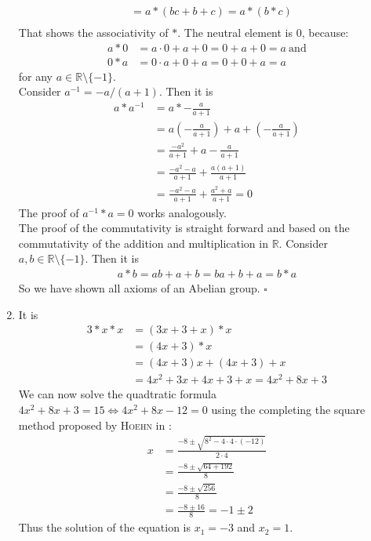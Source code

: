 \documentclass[solution]{tudexercise}
\newcommand{\qed}{\hspace*{\fill}$\square$}
\begin{document}
\begin{enumerate}
\begin{align*}
&= a * (bc + b + c) = a * (b * c)\\
				\end{align*}
				That shows the associativity of $*$.
				\newpage
				The neutral element is $0$, because: 
				\begin{align*}
a * 0 &= a \cdot 0 + a + 0 = 0 + a + 0 = a\ \text{and}\\
0 * a &= 0 \cdot a + 0 + a = 0 + 0 + a = a
				\end{align*}
				for any $a \in \mathbb{R} \setminus \{-1\}$.\\
				Consider $a^{-1} = -a / (a + 1)$. Then it is
				\begin{align*}
a * a^{-1} &= a * - \frac{a}{a + 1}\\
&= a(- \frac{a}{a + 1}) + a + (- \frac{a}{a + 1})\\
&= \frac{-a^2}{a + 1} + a - \frac{a}{a + 1}\\
&= \frac{-a^2 - a}{a + 1} + \frac{a(a + 1)}{a + 1}\\
&= \frac{-a^2 - a}{a + 1} + \frac{a^2 + a}{a + 1} = 0
				\end{align*}
				The proof of $a^{-1} * a = 0$ works analogously.\\
				The proof of the commutativity is straight forward and based on the commutativity of the addition and multiplication in $\mathbb{R}$. Consider $a, b \in \mathbb{R} \setminus \{-1\}$. Then it is
				\begin{align*}
a * b = ab + a + b = ba + b + a = b * a
				\end{align*}
				So we have shown all axioms of an Abelian group. \qed
				
				\item
				It is
				\begin{align*}
3 * x * x &= (3x + 3 + x) * x\\
&= (4x + 3) * x\\
&= (4x + 3)x + (4x + 3) + x\\
&= 4x^2 + 3x + 4x + 3 + x = 4x^2 + 8x + 3
				\end{align*}
				We can now solve the quadtratic formula $4x^2 + 8x + 3 = 15 \Longleftrightarrow 4x^2 + 8x - 12 = 0$ using the completing the square method proposed by \textsc{Hoehn} in \cite{hoehn1975more}:
				\begin{align*}
x &= \frac{-8 \pm \sqrt{8^2 - 4 \cdot 4 \cdot (-12)}}{2 \cdot 4}\\
&= \frac{-8 \pm \sqrt{64 + 192}}{8}\\
&= \frac{-8 \pm \sqrt{256}}{8}\\
&= \frac{-8 \pm 16}{8} = -1 \pm 2
				\end{align*}
				Thus the solution of the equation is $x_1 = -3$ and $x_2 = 1$.
				\end{enumerate}
	
	
	
\end{document}
